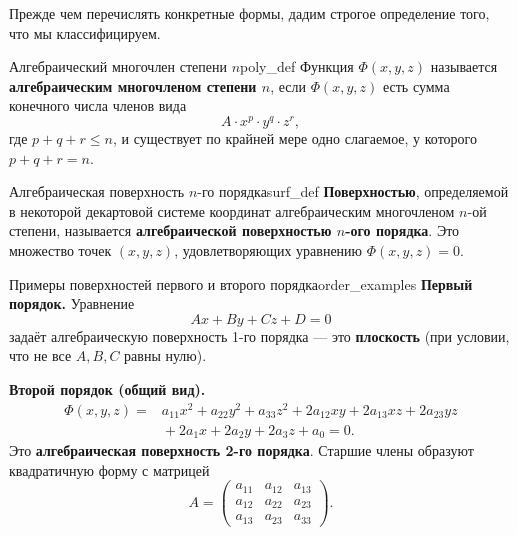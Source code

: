 \documentclass[12pt,a4paper]{article}
\begin{document}
Прежде чем перечислять конкретные формы, дадим строгое определение
того, что мы классифицируем.

\begin{definition}{Алгебраический многочлен степени $n$}{poly_def}
  Функция $\Phi(x, y, z)$ называется \textbf{алгебраическим
  многочленом степени $n$}, если $\Phi(x, y, z)$ есть сумма конечного
  числа членов вида
  \[
    A \cdot x^p \cdot y^q \cdot z^r,
  \]
  где $p + q + r \le n$, и существует по крайней мере одно слагаемое,
  у которого $p + q + r = n$.
\end{definition}

\begin{definition}{Алгебраическая поверхность $n$-го порядка}{surf_def}
  \textbf{Поверхностью}, определяемой в некоторой декартовой системе
  координат алгебраическим многочленом $n$-ой степени, называется
  \textbf{алгебраической поверхностью $n$-ого порядка}. Это множество
  точек $(x, y, z)$, удовлетворяющих уравнению $\Phi(x, y, z) = 0$.
\end{definition}

\begin{definition}{Примеры поверхностей первого и второго
  порядка}{order_examples}
  \textbf{Первый порядок.} Уравнение
  \begin{equation}
    Ax + By + Cz + D = 0 \tag{11.1}
  \end{equation}
  задаёт алгебраическую поверхность 1-го порядка — это
  \textbf{плоскость} (при условии, что не все $A, B, C$ равны нулю).

  \textbf{Второй порядок (общий вид).}
  \begin{equation}
    \begin{aligned}
      \Phi(x, y, z) = {}& a_{11}x^2 + a_{22}y^2 + a_{33}z^2
      + 2a_{12}xy + 2a_{13}xz + 2a_{23}yz \\
      & {}+ 2a_1 x + 2a_2 y + 2a_3 z + a_0 = 0.
    \end{aligned} \tag{11.2}
  \end{equation}
  Это \textbf{алгебраическая поверхность 2-го порядка}. Старшие члены
  образуют квадратичную форму с матрицей
  \[
    A =
    \begin{pmatrix}
      a_{11} & a_{12} & a_{13} \\
      a_{12} & a_{22} & a_{23} \\
      a_{13} & a_{23} & a_{33}
    \end{pmatrix}.
  \]
\end{definition}
\end{document}
